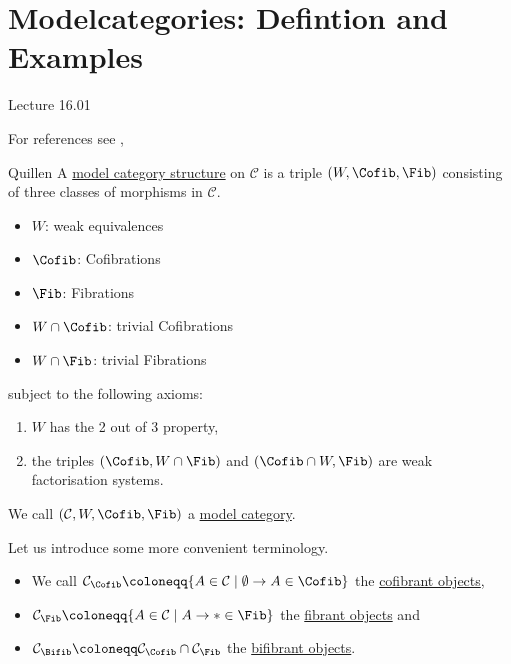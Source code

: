 \section{Modelcategories: Defintion and Examples}

Lecture 16.01

For references see \cite{Cisi}, \cite{Goers}

\begin{defi}{Quillen}
    A \underline{model category structure} on $\mathcal{C}$ is a triple $(W, \Cofib, \Fib)$ consisting of three classes of morphisms in $\mathcal{C}$.
    \begin{itemize}[label={}]
        \item 
        $W$: weak equivalences
        \item 
        $\Cofib$: Cofibrations
        \item  
        $\Fib$: Fibrations
        \item 
        $W \cap \Cofib$: trivial Cofibrations
        \item 
        $W \cap \Fib$: trivial Fibrations
    \end{itemize}
    subject to the following axioms:
    \begin{enumerate}
        \item 
        $W$ has the 2 out of 3 property,
        \item
        the triples $(\Cofib, W \cap \Fib)$ and $( \Cofib \cap W, \Fib)$ are weak factorisation systems.
    \end{enumerate}
    We call $(\mathcal{C}, W, \Cofib, \Fib )$ a \underline{model category}.
\end{defi}

\begin{rmk}
    Let us introduce some more convenient terminology.
    \begin{itemize}
        \item 
        We call $\mathcal{C}_{\Cofib} \coloneqq \{ A \in \mathcal{C} \mid \emptyset \to A \in \Cofib\}$ the \underline{cofibrant objects},
        \item 
        $\mathcal{C}_{\Fib} \coloneqq \{ A \in \mathcal{C} \mid A \to * \in \Fib\}$ the \underline{fibrant objects} and 
        \item   
        $\mathcal{C}_{\Bifib} \coloneqq \mathcal{C}_{\Cofib} \cap \mathcal{C}_{\Fib}$ the \underline{bifibrant objects}.
    \end{itemize}
\end{rmk}

